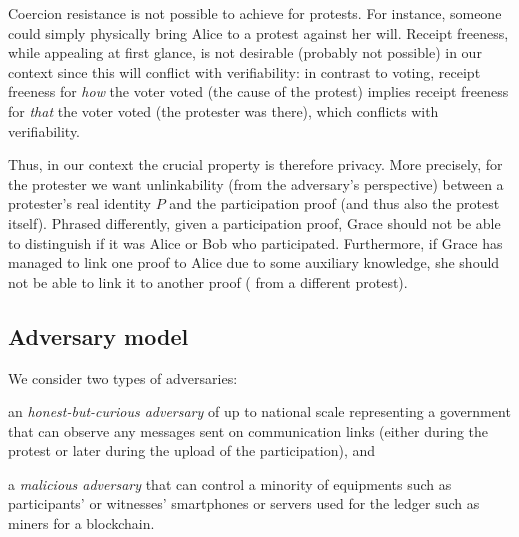Coercion resistance is not possible to achieve for protests.
For instance, someone could simply physically bring Alice to a protest against her will.
Receipt freeness, while appealing at first glance, is not desirable (probably 
not possible) in our context since this will conflict with verifiability: in 
contrast to voting, receipt freeness for \emph{how} the voter voted (\ie the 
cause of the protest) implies receipt freeness for \emph{that} the voter voted 
(\ie the protester was there), which conflicts with verifiability.

Thus, in our context the crucial property is therefore privacy.
More precisely, for the protester we want unlinkability (from the adversary's 
perspective) between a protester's real identity \(P\) and the participation 
proof (and thus also the protest itself).
Phrased differently, given a participation proof, Grace should not be able to 
distinguish if it was Alice or Bob who participated.
Furthermore, if Grace has managed to link one proof to Alice due to some 
auxiliary knowledge, she should not be able to link it to another proof (\eg 
from a different protest).


\subsection{Adversary model}%
\label{adversary-model}

We consider two types of adversaries: 
\begin{enumerate*} 
\item an \emph{honest-but-curious adversary} of up to national scale representing a government that can observe any
messages sent on communication links (\ie either during the protest or later during the upload of the participation), and 
\item a \emph{malicious adversary} that can control a minority of equipments such as participants' or witnesses' smartphones or servers used for the ledger such as miners for a blockchain. 
\end{enumerate*}
